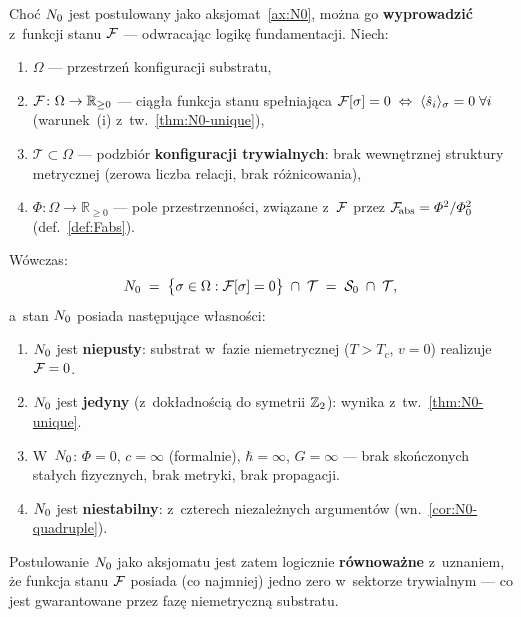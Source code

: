 \begin{proposition}\label{prop:N0-from-F}
Cho\'c $N_0$ jest postulowany jako aksjomat~\ref{ax:N0},
mo\.zna go \textbf{wyprowadzi\'c} z~funkcji stanu $\mathcal{F}$ ---
odwracaj\k{a}c logik\k{e} fundamentacji. Niech:
\begin{enumerate}[nosep]
  \item[(F1)] $\Omega$ --- przestrze\'n konfiguracji substratu,
  \item[(F2)] $\mathcal{F}\colon\Omega\to\mathbb{R}_{\ge 0}$ --- ci\k{a}g\l{}a
    funkcja stanu spe\l{}niaj\k{a}ca $\mathcal{F}[\sigma] = 0
    \;\Leftrightarrow\; \langle\hat{s}_i\rangle_\sigma = 0\;\forall i$
    (warunek~(i) z~tw.~\ref{thm:N0-unique}),
  \item[(F3)] $\mathcal{T}\subset\Omega$ --- podzbi\'or
    \textbf{konfiguracji trywialnych}: brak wewn\k{e}trznej struktury
    metrycznej (zerowa liczba relacji, brak r\'o\.znicowania),
  \item[(F4)] $\Phi\colon\Omega\to\mathbb{R}_{\ge 0}$ --- pole
    przestrzenno\'sci, zwi\k{a}zane z~$\mathcal{F}$ przez
    $\mathcal{F}_{\!\mathrm{abs}} = \varPhi^2/\varPhi_0^2$
    (def.~\ref{def:Fabs}).
\end{enumerate}
W\'owczas:
\begin{equation}\label{eq:N0-derived}
    N_0 \;=\; \bigl\{\sigma \in \Omega :
        \mathcal{F}[\sigma] = 0\bigr\} \;\cap\; \mathcal{T}
    \;=\; \mathcal{S}_0 \;\cap\; \mathcal{T},
\end{equation}
a~stan $N_0$ posiada nast\k{e}puj\k{a}ce w\l{}asno\'sci:
\begin{enumerate}
  \item $N_0$ jest \textbf{niepusty}: substrat w~fazie
    niemetrycznej ($T > T_c$, $v = 0$) realizuje $\mathcal{F} = 0$.
  \item $N_0$ jest \textbf{jedyny} (z~dok\l{}adno\'sci\k{a} do
    symetrii $\mathbb{Z}_2$): wynika z~tw.~\ref{thm:N0-unique}.
  \item W~$N_0$: $\Phi = 0$, $c = \infty$ (formalnie),
    $\hbar = \infty$, $G = \infty$ --- brak sko\'nczonych sta\l{}ych
    fizycznych, brak metryki, brak propagacji.
  \item $N_0$ jest \textbf{niestabilny}: z~czterech niezale\.znych
    argument\'ow (wn.~\ref{cor:N0-quadruple}).
\end{enumerate}
Postulowanie $N_0$ jako aksjomatu jest zatem logicznie
\textbf{r\'ownowa\.zne} z~uznaniem, \.ze funkcja stanu $\mathcal{F}$
posiada (co najmniej) jedno zero w~sektorze trywialnym ---
co jest gwarantowane przez faz\k{e} niemetryczn\k{a} substratu.
\end{proposition}

